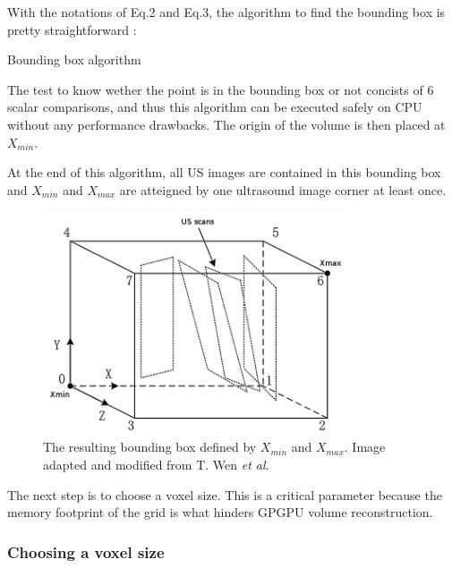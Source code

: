 \documentclass[12pt,journal,compsoc]{IEEEtran}
\begin{document}
With the notations of Eq.2 and Eq.3, the algorithm to find the bounding box is pretty straightforward :

\begin{samepage}
\begin{algorithm}
\caption{Bounding box algorithm}
\label{}
\end{algorithm}
\end{samepage}
	
The test to know wether the point is in the bounding box or not concists of 6 scalar comparisons, and thus this algorithm can be executed safely on CPU without any performance drawbacks.
The origin of the volume is then placed at $X_{min}$.

At the end of this algorithm, all US images are contained in this bounding box and $X_{min}$ and $X_{max}$ are atteigned by one ultrasound image corner at least once.


\begin{figure}[h!]
\centering
\includegraphics[width=3.5in]{bounding_box}
\caption{The resulting bounding box defined by $X_{min}$ and $X_{max}$. Image adapted and modified from T. Wen \textit{et al.} \cite{2}}
\label{fig_2}
\end{figure}

The next step is to choose a voxel size. This is a critical parameter because the memory footprint of the grid is what hinders GPGPU volume reconstruction. 

\subsubsection{Choosing a voxel size}
\end{document}
